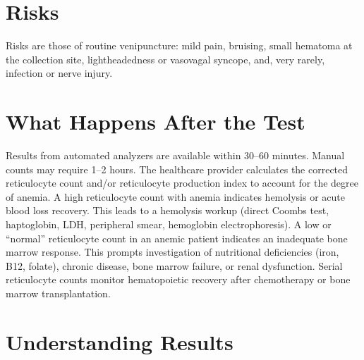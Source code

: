 \section*{Risks}
Risks are those of routine venipuncture: mild pain, bruising, small hematoma at the collection site, lightheadedness or vasovagal syncope, and, very rarely, infection or nerve injury.

\section*{What Happens After the Test}
Results from automated analyzers are available within 30--60 minutes. Manual counts may require 1--2 hours. The healthcare provider calculates the corrected reticulocyte count and/or reticulocyte production index to account for the degree of anemia. A high reticulocyte count with anemia indicates hemolysis or acute blood loss recovery. This leads to a hemolysis workup (direct Coombs test, haptoglobin, LDH, peripheral smear, hemoglobin electrophoresis). A low or ``normal'' reticulocyte count in an anemic patient indicates an inadequate bone marrow response. This prompts investigation of nutritional deficiencies (iron, B12, folate), chronic disease, bone marrow failure, or renal dysfunction. Serial reticulocyte counts monitor hematopoietic recovery after chemotherapy or bone marrow transplantation.

\section*{Understanding Results}

